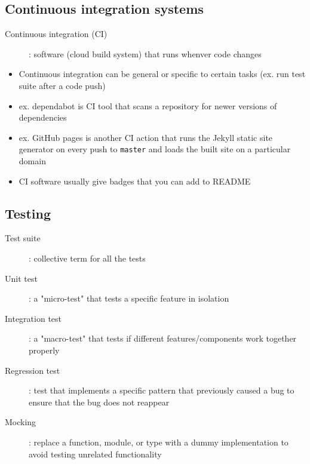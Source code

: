 \documentclass[letterpaper,12pt]{article}
\begin{document}
\subsection{Continuous integration systems}
\begin{description}
 \item[Continuous integration (CI)]: software (cloud build system) that runs whenver code changes
\end{description}

\begin{itemize}
 \item Continuous integration can be general or specific to certain tasks (ex. run test suite after a code push)
 \item ex. dependabot is CI tool that scans a repository for newer versions of dependencies
 \item ex. GitHub pages is another CI action that runs the Jekyll static site generator on every push to \lstinline{master} and loads the built site on a particular domain
 \item CI software usually give badges that you can add to README
\end{itemize}

\subsection{Testing}
\begin{description}
 \item[Test suite]: collective term for all the tests
 \item[Unit test]: a "micro-test" that tests a specific feature in isolation
 \item[Integration test]: a "macro-test" that tests if different features/components work together properly
 \item[Regression test]: test that implements a specific pattern that previously caused a bug to ensure that the bug does not reappear
 \item[Mocking]: replace a function, module, or type with a dummy implementation to avoid testing unrelated functionality
\end{description}
\end{document}
